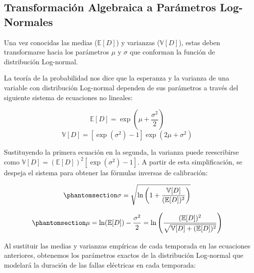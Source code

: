 \documentclass[
  spanish,
  letterpaper,
  DIV=11,
  numbers=noendperiod]{scrreprt}
\theoremstyle{plain}
\theoremstyle{plain}
\theoremstyle{plain}
\theoremstyle{definition}
\theoremstyle{remark}
\begin{document}
\subsection{Transformación Algebraica a Parámetros
Log-Normales}\label{transformaciuxf3n-algebraica-a-paruxe1metros-log-normales}

Una vez conocidas las medias (\(\mathbb{E}[D]\)) y varianzas
(\(\mathbb{V}[D]\)), estas deben transformarse hacia los parámetros
\(\mu\) y \(\sigma\) que conforman la función de distribución
Log-normal.

La teoría de la probabilidad nos dice que la esperanza y la varianza de
una variable con distribución Log-normal dependen de sus parámetros a
través del siguiente sistema de ecuaciones no lineales:

\[
\mathbb{E}[D] = \exp\left(\mu + \frac{\sigma^2}{2}\right)
\] \[
\mathbb{V}[D] = \left[\exp(\sigma^2) - 1\right] \exp(2\mu + \sigma^2)
\]

Sustituyendo la primera ecuación en la segunda, la varianza puede
reescribirse como
\(\mathbb{V}[D] = (\mathbb{E}[D])^2 \left[\exp(\sigma^2) - 1\right]\). A
partir de esta simplificación, se despeja el sistema para obtener las
fórmulas inversas de calibración:

\begin{equation}\phantomsection\label{eq-sigma-lognormal}{
\sigma = \sqrt{\ln\left(1 + \frac{\mathbb{V}[D]}{(\mathbb{E}[D])^2}\right)}
}\end{equation}

\begin{equation}\phantomsection\label{eq-mu-lognormal}{
\mu = \ln(\mathbb{E}[D]) - \frac{\sigma^2}{2} = \ln\left( \frac{(\mathbb{E}[D])^2}{\sqrt{\mathbb{V}[D] + (\mathbb{E}[D])^2}} \right)
}\end{equation}

Al sustituir las medias y varianzas empíricas de cada temporada en las
ecuaciones anteriores, obtenemos los parámetros exactos de la
distribución Log-normal que modelará la duración de las fallas
eléctricas en cada temporada:
\end{document}
